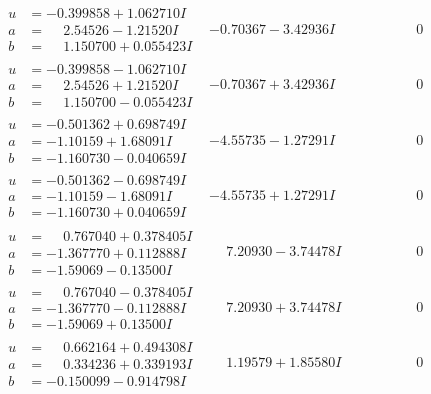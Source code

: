 \documentclass[1p]{elsarticle_modified}
\theoremstyle{definition}
\begin{document}
$$\begin{array}{c|c|c}
\begin{aligned}
u &= -0.399858 + 1.062710 I \\
a &= \phantom{-}2.54526 - 1.21520 I \\
b &= \phantom{-}1.150700 + 0.055423 I\end{aligned}
 & -0.70367 - 3.42936 I & \phantom{-0.000000 } 0 \\ \hline\begin{aligned}
u &= -0.399858 - 1.062710 I \\
a &= \phantom{-}2.54526 + 1.21520 I \\
b &= \phantom{-}1.150700 - 0.055423 I\end{aligned}
 & -0.70367 + 3.42936 I & \phantom{-0.000000 } 0 \\ \hline\begin{aligned}
u &= -0.501362 + 0.698749 I \\
a &= -1.10159 + 1.68091 I \\
b &= -1.160730 - 0.040659 I\end{aligned}
 & -4.55735 - 1.27291 I & \phantom{-0.000000 } 0 \\ \hline\begin{aligned}
u &= -0.501362 - 0.698749 I \\
a &= -1.10159 - 1.68091 I \\
b &= -1.160730 + 0.040659 I\end{aligned}
 & -4.55735 + 1.27291 I & \phantom{-0.000000 } 0 \\ \hline\begin{aligned}
u &= \phantom{-}0.767040 + 0.378405 I \\
a &= -1.367770 + 0.112888 I \\
b &= -1.59069 - 0.13500 I\end{aligned}
 & \phantom{-}7.20930 - 3.74478 I & \phantom{-0.000000 } 0 \\ \hline\begin{aligned}
u &= \phantom{-}0.767040 - 0.378405 I \\
a &= -1.367770 - 0.112888 I \\
b &= -1.59069 + 0.13500 I\end{aligned}
 & \phantom{-}7.20930 + 3.74478 I & \phantom{-0.000000 } 0 \\ \hline\begin{aligned}
u &= \phantom{-}0.662164 + 0.494308 I \\
a &= \phantom{-}0.334236 + 0.339193 I \\
b &= -0.150099 - 0.914798 I\end{aligned}
 & \phantom{-}1.19579 + 1.85580 I & \phantom{-0.000000 } 0 \\ \hline\begin{aligned}

\end{aligned}
\end{array}$$
\end{document}
